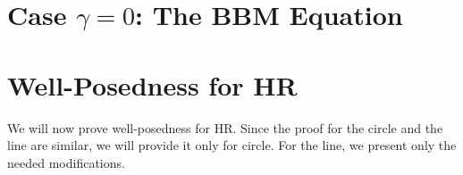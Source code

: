 \section{Case $\gamma = 0$: The BBM Equation} 
\label{sec:}

%
%
%	
%
%
%
%
%
%
%
%
%
\section{Well-Posedness for HR}
\label{sec:4}

%
%
%
%
%
We will now prove well-posedness for HR.
Since the proof for the circle and the line are similar,
we will provide it only for circle.
For the line, we present only the
needed modifications.
%
%
%
%
%

